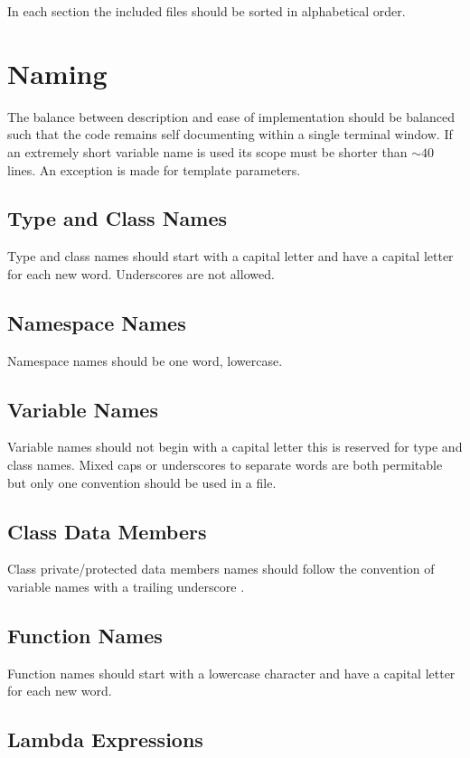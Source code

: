In each section the included files should be sorted in alphabetical order.

\section{Naming}
The balance between description and ease of implementation should be balanced such that the code remains self documenting within a single terminal window.  If an extremely short variable name is used its scope must be shorter than $\sim 40$ lines. An exception is made for template parameters.

\subsection{Type and Class Names}

Type and class names should start with a capital letter and have a capital letter for each new word.
Underscores \inlinecode{_} are not allowed. 
\subsection{Namespace Names}

Namespace names should be one word, lowercase.

\subsection{Variable Names}

Variable names should not begin with a capital letter this is reserved for type and class names. Mixed caps or underscores to separate words are both permitable but only one convention should be used in a file.

\subsection{Class Data Members}

Class private/protected data members names should follow the convention of variable names with a trailing underscore \inlinecode{_}.

\subsection{Function Names}

Function names should start with a lowercase character and have a capital letter for each new word.

\subsection{Lambda Expressions}

